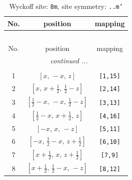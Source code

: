 \documentclass[fleqn,8pt]{jsarticle}
\begin{document}
\begin{longtable}{ccc}
\caption{Wyckoff site: {\tt 8m}, site symmetry: {\tt ..m'}}
 \\
 \hline \hline
No. & position & mapping \\ \hline \endfirsthead

\multicolumn{2}{l}{\tablename\ \thetable{}} \\
 \hline \hline
No. & position & mapping \\ \hline \endhead

 \hline \hline
\multicolumn{2}{r}{\footnotesize\it continued ...} \\ \endfoot

 \hline \hline
\multicolumn{2}{r}{} \\ \endlastfoot

1 & $\left[ x,\, - x,\, z \right]$ & {\tt [1,15]} \\ \hline
2 & $\left[ x,\, x + \frac{1}{2},\, \frac{1}{2} - z \right]$ & {\tt [2,14]} \\ \hline
3 & $\left[ \frac{1}{2} - x,\, - x,\, \frac{1}{2} - z \right]$ & {\tt [3,13]} \\ \hline
4 & $\left[ \frac{1}{2} - x,\, x + \frac{1}{2},\, z \right]$ & {\tt [4,16]} \\ \hline
5 & $\left[ - x,\, x,\, - z \right]$ & {\tt [5,11]} \\ \hline
6 & $\left[ - x,\, \frac{1}{2} - x,\, z + \frac{1}{2} \right]$ & {\tt [6,10]} \\ \hline
7 & $\left[ x + \frac{1}{2},\, x,\, z + \frac{1}{2} \right]$ & {\tt [7,9]} \\ \hline
8 & $\left[ x + \frac{1}{2},\, \frac{1}{2} - x,\, - z \right]$ & {\tt [8,12]} \\
\end{longtable}
\renewcommand{\arraystretch}{1.2}
\end{document}
